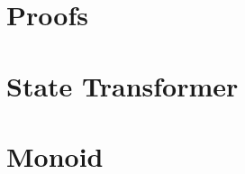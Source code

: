 \documentclass[10pt,a4paper]{article}
\begin{document}
\maketitle
\vfill

\clearpage
\tableofcontents
\clearpage























\appendix
\pagebreak
\section{Proofs}


\pagebreak
\section{State Transformer}


\pagebreak
\section{Monoid}


\clearpage

\end{document}
